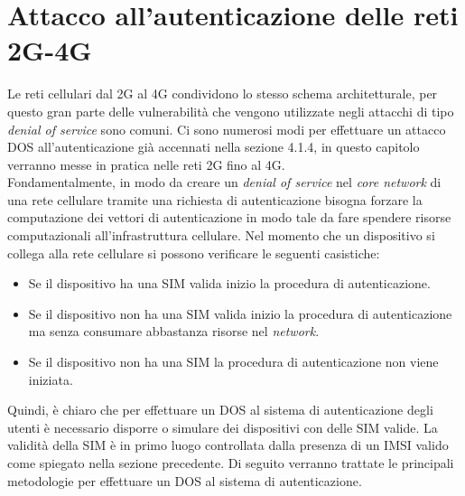 \chapter{Attacco all'autenticazione delle reti 2G-4G}
Le reti cellulari dal 2G al 4G condividono lo stesso schema architetturale, per questo gran parte delle vulnerabilità che vengono
utilizzate negli attacchi di tipo \textit{denial of service} sono comuni.
Ci sono numerosi modi per effettuare un attacco DOS all'autenticazione già accennati nella sezione 4.1.4, in questo capitolo verranno messe in pratica 
nelle reti 2G fino al 4G.\\
Fondamentalmente, in modo da creare un \textit{denial of service} nel \textit{core network} di una rete cellulare tramite una richiesta di autenticazione bisogna forzare
la computazione dei vettori di autenticazione in modo tale da fare spendere risorse computazionali all'infrastruttura cellulare.
Nel momento che un dispositivo si collega alla rete cellulare si possono verificare le seguenti casistiche:
\begin{itemize}
    \item Se il dispositivo ha una SIM valida inizio la procedura di autenticazione.
    \item Se il dispositivo non ha una SIM valida inizio la procedura di autenticazione ma senza consumare abbastanza risorse nel \textit{network}.
    \item Se il dispositivo non ha una SIM la procedura di autenticazione non viene iniziata.
\end{itemize}
Quindi, è chiaro che per effettuare un DOS al sistema di autenticazione degli utenti è necessario disporre o simulare dei dispositivi con delle SIM valide. La validità della SIM è 
in primo luogo controllata dalla presenza di un IMSI valido come spiegato nella sezione precedente.
Di seguito verranno trattate le principali metodologie per effettuare un DOS al sistema di autenticazione.

